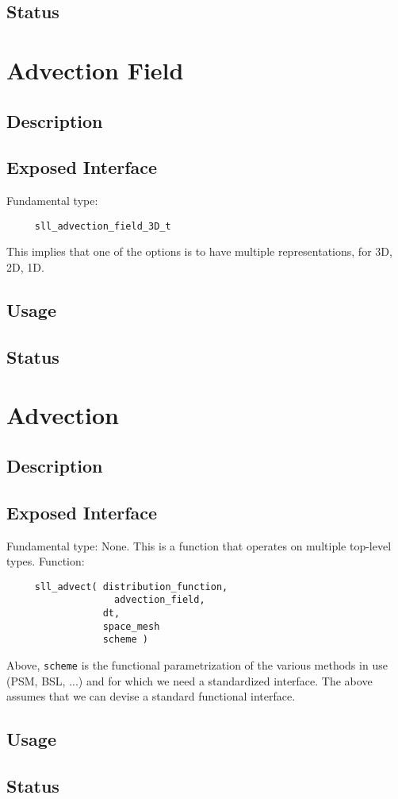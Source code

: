 \documentclass[]{report}   %
\begin{document}
\subsection{Status}

\section{Advection Field}
\subsection{Description}
\subsection{Exposed Interface}
Fundamental type:
\begin{verbatim}
     sll_advection_field_3D_t
\end{verbatim}
This implies that one of the options is to have multiple representations, for 3D, 2D, 1D. 
\subsection{Usage}
\subsection{Status}

\section{Advection}
\subsection{Description}
\subsection{Exposed Interface}
Fundamental type: None. This is a function that operates on multiple top-level types. Function:
\begin{verbatim}
     sll_advect( distribution_function, 
     	           advection_field, 
                 dt, 
                 space_mesh
                 scheme )
\end{verbatim}
Above, \verb+scheme+ is the functional parametrization of the various methods in use (PSM, BSL, ...) and for which we need a standardized interface. The above assumes that we can devise a standard functional interface.
\subsection{Usage}
\subsection{Status}

\begin{comment}

\begin{thebibliography}{9}
\end{thebibliography}


\end{comment}
\end{document}

